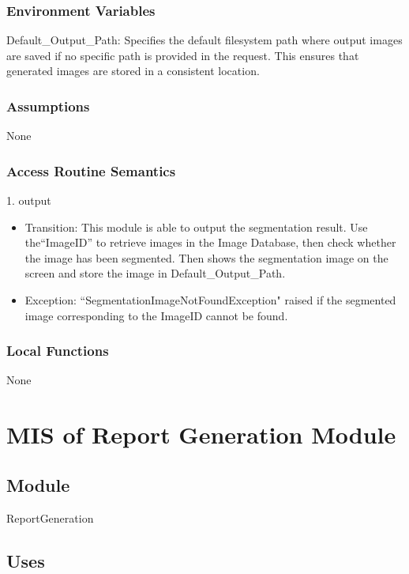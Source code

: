 \documentclass[12pt, titlepage]{article}
\begin{document}
\subsubsection{Environment Variables}
Default\_Output\_Path: Specifies the default filesystem path where output images are saved if no specific path is provided in the request. This ensures that generated images are stored in a consistent location.

\subsubsection{Assumptions}
None
   
\subsubsection{Access Routine Semantics}
1. output
\begin{itemize}
\item Transition: This module is able to output the segmentation result. Use the``ImageID” to retrieve images in the Image Database, then check whether the image has been segmented. Then shows the segmentation image on the screen and store the image in Default\_Output\_Path.

\item Exception:  ``SegmentationImageNotFoundException" raised if the segmented image corresponding to the ImageID cannot be found.
\end{itemize}

\subsubsection{Local Functions}

None


\newpage
\section{MIS of Report Generation Module} \label{m6} 

\subsection{Module}

ReportGeneration

\subsection{Uses}
\end{document}
